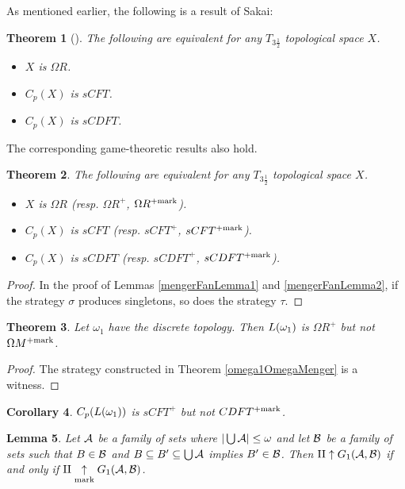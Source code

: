 \documentclass{amsart}
\theoremstyle{plain}
\newtheorem{theorem}{Theorem}
\newtheorem{lemma}[theorem]{Lemma}
\newtheorem{corollary}[theorem]{Corollary}
\theoremstyle{definition}
\theoremstyle{remark}
\theoremstyle{plain}
\theoremstyle{definition}
\theoremstyle{remark}
\begin{document}
As mentioned earlier, the following is a result of Sakai:

\begin{theorem}[\cite{MR964873}]
  The following are equivalent for any \(T_{3\frac{1}{2}}\)
  topological space \(X\).
    \begin{itemize}
      \item \(X\) is \(\Omega R\).
      \item \(C_p(X)\) is \(sCFT\).
      \item \(C_p(X)\) is \(sCDFT\).
    \end{itemize}
\end{theorem}

The corresponding game-theoretic results also hold.

\begin{theorem}
  The following are equivalent for any \(T_{3\frac{1}{2}}\)
  topological space \(X\).
    \begin{itemize}
      \item \(X\) is \(\Omega R\)
            (resp. \(\Omega R^+\), \(\Omega R^{+\mathrm{mark}}\)).
      \item \(C_p(X)\) is \(sCFT\)
            (resp. \(sCFT^+\), \(sCFT^{+\mathrm{mark}}\)).
      \item \(C_p(X)\) is \(sCDFT\)
            (resp. \(sCDFT^+\), \(sCDFT^{+\mathrm{mark}}\)).
    \end{itemize}
\end{theorem}

\begin{proof}
  In the proof of Lemmas \ref{mengerFanLemma1} and \ref{mengerFanLemma2},
  if the strategy \(\sigma\) produces singletons, so does the strategy
  \(\tau\).
\end{proof}

\begin{theorem}
  Let \(\omega_1\) have the discrete topology. Then
  \(L(\omega_1)\) is \(\Omega R^+\) but not \(\Omega M^{+\mathrm{mark}}\).
\end{theorem}

\begin{proof}
  The strategy constructed in Theorem \ref{omega1OmegaMenger} is a witness.
\end{proof}

\begin{corollary}
  \(C_p(L(\omega_1))\) is \(sCFT^+\) but not \(CDFT^{+\mathrm{mark}}\).
\end{corollary}

\begin{lemma}
  Let \(\mathcal{A}\) be a family of sets where
  \(|\bigcup\mathcal{A}|\leq\omega\)
  and let \(\mathcal{B}\) be a family of sets such that
  \(B\in\mathcal{B}\) and \(B\subseteq B'\subseteq\bigcup\mathcal{A}\)
  implies \(B'\in\mathcal{B}\). Then
  \(\mathrm{II}\uparrow G_{1}(\mathcal{A},\mathcal{B})\) if and only if
  \(\mathrm{II}\underset{\text{mark}}{\uparrow}G_{1}(\mathcal{A},\mathcal{B})\).
\end{lemma}
\end{document}
